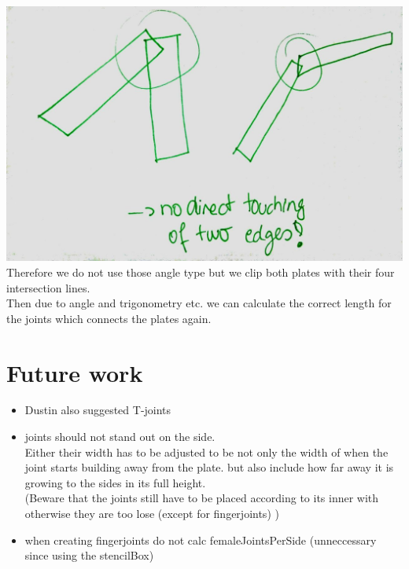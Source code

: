\documentclass[../ClassicThesis.tex]{subfiles}
\begin{document}
\begin{itemize}
        \includegraphics[width=0.5\columnwidth]{Images/06-2-joints-angleTypesWrongAssumption.jpg}\\
        Therefore we do not use those angle type but we clip both plates with their four intersection lines. \\
        Then due to angle and trigonometry etc. we can calculate the correct length for the joints which connects the plates again.
    \end{itemize}
    
    
    
\section{Future work}
    \begin{itemize}
        \item Dustin also suggested T-joints
        \item joints should not stand out on the side. \\
        Either their width has to be adjusted to be not only the width of when the joint starts building away from the plate. but also include how far away it is growing to the sides in its full height. \\
    (Beware that the joints still have to be placed according to its inner with otherwise they are too lose (except for fingerjoints) )
        \item when creating fingerjoints do not calc femaleJointsPerSide (unneccessary since using the stencilBox)
    \end{itemize}
\end{document}
